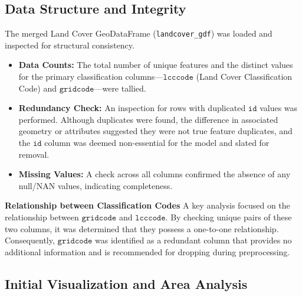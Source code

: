 \subsection{Data Structure and Integrity}

The merged Land Cover GeoDataFrame (\texttt{landcover\_gdf}) was loaded and inspected for structural consistency.

\begin{itemize}
    \item \textbf{Data Counts:} The total number of unique features and the distinct values for the primary classification columns—$\texttt{lcccode}$ (Land Cover Classification Code) and $\texttt{gridcode}$—were tallied.
    \item \textbf{Redundancy Check:} An inspection for rows with duplicated $\texttt{id}$ values was performed. Although duplicates were found, the difference in associated geometry or attributes suggested they were not true feature duplicates, and the $\texttt{id}$ column was deemed non-essential for the model and slated for removal.
    \item \textbf{Missing Values:} A check across all columns confirmed the absence of any null/NAN values, indicating completeness.
\end{itemize}

\textbf{Relationship between Classification Codes}
A key analysis focused on the relationship between $\texttt{gridcode}$ and $\texttt{lcccode}$. By checking unique pairs of these two columns, it was determined that they possess a one-to-one relationship. Consequently, $\texttt{gridcode}$ was identified as a redundant column that provides no additional information and is recommended for dropping during preprocessing.

 

\subsection{Initial Visualization and Area Analysis}


